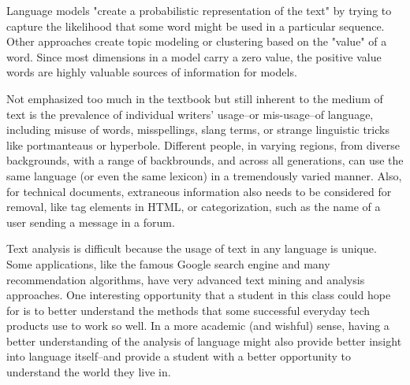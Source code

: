\documentclass[11pt]{article}
\begin{document}
  Language models "create a probabilistic representation of the text" by trying to capture the likelihood that some word might be used in a particular sequence.
  Other approaches create topic modeling or clustering based on the "value" of a word.
  Since most dimensions in a model carry a zero value, the positive value words are highly valuable sources of information for models.
 
  Not emphasized too much in the textbook but still inherent to the medium of text is the prevalence of individual writers' usage--or mis-usage--of language, including misuse of words, misspellings, slang terms, or strange linguistic tricks like portmanteaus or hyperbole.
  Different people, in varying regions, from diverse backgrounds, with a range of backbrounds, and across all generations, can use the same language (or even the same lexicon) in a tremendously varied manner.
  Also, for technical documents, extraneous information also needs to be considered for removal, like tag elements in HTML, or categorization, such as the name of a user sending a message in a forum.
  
  Text analysis is difficult because the usage of text in any language is unique.
  Some applications, like the famous Google search engine and many recommendation algorithms, have very advanced text mining and analysis approaches.
  One interesting opportunity that a student in this class could hope for is to better understand the methods that some successful everyday tech products use to work so well.
  In a more academic (and wishful) sense, having a better understanding of the analysis of language might also provide better insight into language itself--and provide a student with a better opportunity to understand the world they live in.
\end{document}
